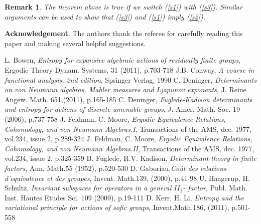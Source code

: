 \documentclass[12pt]{amsart}
\newtheorem{remark}[teo]{Remark}
\numberwithin{equation}{section}
\begin{document}
\begin{remark} The theorem above is true  if we switch (\ref{s1}) with (\ref{s3}). Similar arguments can be used to show that (\ref{s3}) and (\ref{s1}) imply (\ref{s2}).
\end{remark}

\noindent
\textbf{Acknowledgement}. The authors thank the referee for carefully reading this paper and making several helpful suggestions.  

\begin{thebibliography}{99}
L. Bowen, \emph{ Entropy for expansive algebraic actions of residually finite groups}, Ergodic Theory Dynam. Systems, 31 (2011), p.703-718
J.B. Conway,  \emph{ A course in functional analysis, 2nd edition}, Springer Verlag, 1990
C. Deninger, \emph{ Determinants on von Neumann algebras, Mahler measures and Ljapunov exponents}, J. Reine Angew. Math. 651,(2011), p.165-185
C. Deninger, \emph{ Fuglede-Kadison determinants and entropy for actions of discrete
amenable groups}, J. Amer. Math. Soc. 19 (2006), p.737-758
J. Feldman, C. Moore, \emph{ Ergodic Equivalence Relations, Cohomology, and von Neumann
Algebras.I}, Transactions of the AMS, dec. 1977, vol.234, issue 2, p.289-324
J. Feldman, C. Moore, \emph{ Ergodic Equivalence Relations, Cohomology, and von Neumann
Algebras.II}, Transactions of the AMS, dec. 1977, vol.234, issue 2, p.325-359
B. Fuglede, R.V. Kadison,\emph{ Determinant theory in finite factors}, Ann. Math.55 (1952), p.520-530
D. Gaboriau,\emph{Co\^{u}t des relations d'equivalence et des groupes}, Invent. Math.139, (2000), p.41-98
 U. Haagerup, H. Schultz, \emph{ Invariant subspaces for operators in a general $II_1$-
factor}, Publ. Math. Inst. Hautes Etudes Sci. 109 (2009), p.19-111
D. Kerr, H. Li, \emph{ Entropy and the variational principle for actions of sofic groups}, Invent.Math.186, (2011), p.501-558
\end{thebibliography}
\end{document}
